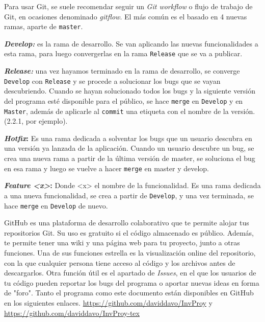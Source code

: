 \documentclass[a4paper, 11pt]{report} %
\begin{document}
Para usar Git, se suele recomendar seguir un \textit{Git workflow} o flujo de trabajo de Git, en ocasiones denominado \textit{gitflow}. El más común es el basado en 4 nuevas ramas, aparte de \texttt{master}.
\begin{description}
\item \textbf{\textit{Develop:}} es la rama de desarrollo. Se van aplicando las nuevas funcionalidades a esta rama, para luego convergerlas en la rama \texttt{Release} que se va a publicar.
\item \textbf{\textit{Release:}} una vez hayamos terminado en la rama de desarrollo, se converge \texttt{Develop} con \texttt{Release} y se procede a solucionar los bugs que se vayan descubriendo. Cuando se hayan solucionado todos los bugs y la siguiente versión del programa esté disponible para el público, se hace \texttt{merge} en \texttt{Develop} y en \texttt{Master}, además de aplicarle al \texttt{commit} una etiqueta con el nombre de la versión. (2.2.1, por ejemplo).
\item \textbf{\textit{Hotfix}:} Es una rama dedicada a solventar los \glspl{bug} que un usuario descubra en una versión ya lanzada de la aplicación. Cuando un usuario descubre un bug, se crea una nueva rama a partir de la última versión de master, se soluciona el bug en esa rama y luego se vuelve a hacer \texttt{merge} en master y develop.
\item \textbf{\textit{Feature <x>}:} Donde <x> el nombre de la funcionalidad. Es una rama dedicada a una nueva funcionalidad, se crea a partir de \texttt{Develop}, y una vez terminada, se hace \texttt{merge} en \texttt{Develop} de nuevo.
\end{description}

GitHub es una plataforma de desarrollo colaborativo que te permite alojar tus repositorios Git. Su uso es gratuito si el código almacenado es público. Además, te permite tener una wiki y una página web para tu proyecto, junto a otras funciones.
Una de sus funciones estrella es la visualización online del repositorio, con la que cualquier persona tiene acceso al código y los archivos antes de descargarlos. Otra función útil es el apartado de \textit{Issues}, en el que los usuarios de tu código pueden reportar los bugs del programa o aportar nuevas ideas en forma de "foro".
Tanto el programa como este documento están disponibles en GitHub en los siguientes enlaces. \url{https://github.com/daviddavo/InvProy} y \url{https://github.com/daviddavo/InvProy-tex}

\newpage
\end{document}
